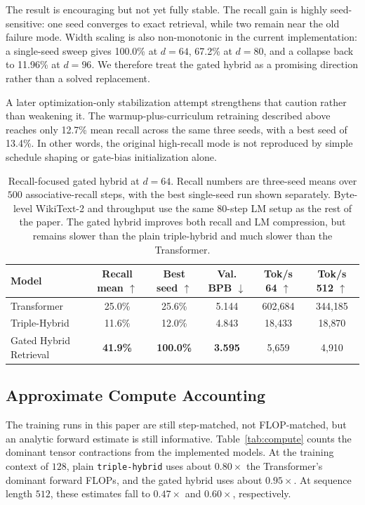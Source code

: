 \documentclass[11pt]{article}
\begin{document}
The result is encouraging but not yet fully stable. The recall gain is highly
seed-sensitive: one seed converges to exact retrieval, while two remain near
the old failure mode. Width scaling is also non-monotonic in the current
implementation: a single-seed sweep gives 100.0\% at $d=64$, 67.2\% at
$d=80$, and a collapse back to 11.96\% at $d=96$. We therefore treat the
gated hybrid as a promising direction rather than a solved replacement.

A later optimization-only stabilization attempt strengthens that caution rather
than weakening it. The warmup-plus-curriculum retraining described above
reaches only 12.7\% mean recall across the same three seeds, with a best seed
of 13.4\%. In other words, the original high-recall mode is not reproduced by
simple schedule shaping or gate-bias initialization alone.

\begin{table}[t]
\centering
\small
\begin{tabular}{lccccc}
\toprule
Model & Recall mean $\uparrow$ & Best seed $\uparrow$ & Val. BPB $\downarrow$ & Tok/s 64 $\uparrow$ & Tok/s 512 $\uparrow$ \\
\midrule
Transformer & 25.0\% & 25.6\% & 5.144 & 602{,}684 & 344{,}185 \\
Triple-Hybrid & 11.6\% & 12.0\% & 4.843 & 18{,}433 & 18{,}870 \\
Gated Hybrid Retrieval & \textbf{41.9\%} & \textbf{100.0\%} & \textbf{3.595} & 5{,}659 & 4{,}910 \\
\bottomrule
\end{tabular}
\caption{Recall-focused gated hybrid at $d=64$. Recall numbers are three-seed
means over $500$ associative-recall steps, with the best single-seed run shown
separately. Byte-level WikiText-2 and throughput use the same $80$-step LM
setup as the rest of the paper. The gated hybrid improves both recall and LM
compression, but remains slower than the plain triple-hybrid and much slower
than the Transformer.}
\label{tab:recall_hybrid}
\end{table}

\subsection{Approximate Compute Accounting}
The training runs in this paper are still step-matched, not FLOP-matched, but
an analytic forward estimate is still informative. Table~\ref{tab:compute}
counts the dominant tensor contractions from the implemented models. At the
training context of $128$, plain \texttt{triple-hybrid} uses about $0.80\times$
the Transformer's dominant forward FLOPs, and the gated hybrid uses about
$0.95\times$. At sequence length $512$, these estimates fall to $0.47\times$
and $0.60\times$, respectively.
\end{document}
